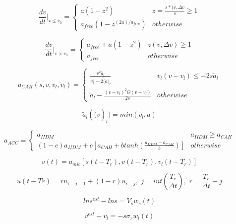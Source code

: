 \documentclass[12pt]{article}
\begin{document}
$$\frac{dv}{dt}\Bigr|_{v\le v_0}= \begin{cases}
a (1-z^2) & z = \frac{s*(v, \Delta v}{s} \ge 1\\
a_{free}(1 - z^{(2a)/a_{free}})& otherwise
\end{cases}$$

$$\frac{dv}{dt}\Bigr|_{v> v_0}= \begin{cases}
a_{free} + a (1-z^2) & z(v, \Delta v) \ge 1\\
a_{free} & otherwise
\end{cases}$$

$$a_{CAH}(s,v,v_l, \dot{v}_l)= \begin{cases}
\frac{v^2\tilde{a}_l}{v_l^2 - 2 \tilde(a)_l} & v_l(v-v_l) \le -2s\tilde{a}_l\\
\tilde{a}_l - \frac{(v-v_l)^2 \Theta (v-v_l)}{2s} & otherwise
\end{cases}$$

$$\tilde{a}_l(\dot(v)_l) = min(\dot{v}_l, a)$$

$$a_{ACC}= \begin{cases}
a_{IIDM} & a_{IIDM} \ge a_{CAH}\\
(1-c)a_{IIDM} + c\left[a_{CAH} + b tanh(\frac{a_{IIDM}-a_{CAH}}{b}) \right] & otherwise
\end{cases}$$

$$\dot{v}(t) = a_{mic}\left[s(t-T_r), v(t-T_r), v_l(t-T_r) \right]$$

$$u(t-Tr) = ru_{i-j-1} + (1-r)u_{i-j},  \, \, j = int\left(\frac{T_r}{\Delta t} \right), \, \, r = \frac{T_r}{\Delta t} - j$$

$$ln s^{est} - ln s = V_s w_s(t) $$

$$v^{est} - v_l = -s \sigma_r w_l(t)$$
\end{document}
